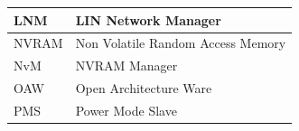 \begin{longtable}{|l|l|}
\begin{minipage}{0.31\linewidth}\raggedright\vspace{.75ex}LNM\vspace{.75ex}\end{minipage} & \begin{minipage}{0.63\linewidth}\raggedright\vspace{.75ex}LIN Network Manager\vspace{.75ex}\end{minipage}\\\hline
\begin{minipage}{0.31\linewidth}\raggedright\vspace{.75ex}NVRAM\vspace{.75ex}\end{minipage} & \begin{minipage}{0.63\linewidth}\raggedright\vspace{.75ex}Non Volatile Random Access Memory\vspace{.75ex}\end{minipage}\\\hline
\begin{minipage}{0.31\linewidth}\raggedright\vspace{.75ex}NvM\vspace{.75ex}\end{minipage} & \begin{minipage}{0.63\linewidth}\raggedright\vspace{.75ex}NVRAM Manager\vspace{.75ex}\end{minipage}\\\hline
\begin{minipage}{0.31\linewidth}\raggedright\vspace{.75ex}OAW\vspace{.75ex}\end{minipage} & \begin{minipage}{0.63\linewidth}\raggedright\vspace{.75ex}Open Architecture Ware\vspace{.75ex}\end{minipage}\\\hline
\begin{minipage}{0.31\linewidth}\raggedright\vspace{.75ex}PMS\vspace{.75ex}\end{minipage} & \begin{minipage}{0.63\linewidth}\raggedright\vspace{.75ex}Power Mode Slave\vspace{.75ex}\end{minipage}\\\hline

\end{longtable}

